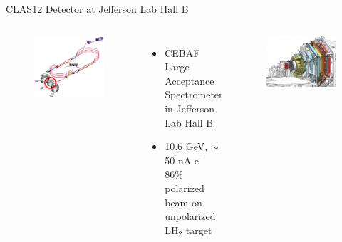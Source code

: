 \documentclass[aspectratio=169]{beamer}
\begin{document}
\begin{frame}{CLAS12 Detector at Jefferson Lab Hall B} \label{frame:datasets1}
        \vspace{-0.5cm}
        \begin{columns}[t, onlytextwidth]
                \begin{figure}[t!]
                    \includegraphics[width=.6349\textwidth]{DNP/jlab_hall_b_circled.jpg}
                    
                    
                \end{figure}
                \vspace{-0.45cm}
                  \begin{itemize}
                    \setlength\itemsep{1em}
                    \item CEBAF Large Acceptance Spectrometer in Jefferson Lab Hall B
                    \item 10.6 GeV, $\sim$ 50 nA e$^-$ 86\% polarized beam on unpolarized LH$_2$ target
                    \end{itemize}
                    
                \begin{figure}[t!]
                    \includegraphics[width=.765899\textwidth]{DNP/CLASdetector.jpg}
                    

\end{figure}
\end{columns}
\end{frame}
\end{document}
